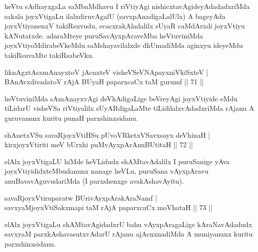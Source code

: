 \begin{artha}
heVtu sAdhayxgaLa saMbaMdhavu I riVtiyAgi nishicxtavAgideyAdadadxriMda sakala joyxVtigaLu ilalxdiruvAgalU (savxpAnxdigaLalUlx) A bageyAda joyxVtiyanenxV takiRsuvudu, ecacxrakAladalilx sUyaR caMdArxdi joyxVtiyu kANutatxde. adaraMteye puruSavAyxpAraveMba heVtuviniMda joyxVtiyoMdirabeVkeMdu saMshayavilalxde dhUmadiMda aginxyu ideyeMdu takiRsuvaMte takiRsabeVku.
\end{artha}


\begin{shl}
liknAgxtAsxmAnayxtoV jAcnxteV visheVSeVNApayxniVkiSxteV | \\
BAnAvxdivadatoV rAjA BUyaH paparxcaCx taM gurumf \hfill||  71 ||  
\end{shl}

\begin{artha}
heVtuviniMda sAmAnayxvAgi deVhAdigaLige beVreyAgi joyxVtiyide eMdu tiLidarU visheVSa riVtiyalilx sUyARdigaLaMte tiLidilalxvAdadxriMda rAjanu A guruvanunx kuritu punaH parxshinxsidanu.
\end{artha}

\begin{shl}
shAnetxVSu savaRjoyxVtiHSu pUvoVRketxVSavxsayx deVhinaH | \\
kirxjoyxVtiriti meV bUrxhi puMvAyxpArAnuBUtitaH \hfill||  72 ||  
\end{shl}

\begin{artha}
elAlx joyxVtigaLU hiMde heVLidudx shAMtavAdalilx I puruSanige yAva joyxVtiyididxteMbudanunx nanage heVLu, puruSana vAyxpAravu anuBavavAguvudariMda (I parxshenxge avakAshavAyitu).
\end{artha}


\begin{shl}
savaRjoyxVtiruparatw BUrivAyxpArakAraNamf | \\
savxyaMjoyxVtiSakxmapi taM rAjA paparxcaCx moVhataH \hfill||  73 ||  
\end{shl}

\begin{artha}
elAlx joyxVtigaLu shAMtavAgidadxrU bahu vAyxpAragaLige kAraNavAdadudx savxyaM parxkAshavasutxvAdarU rAjanu ajAcnxnadiMda A muniyanunx kuritu parxshinxsidanu.
\end{artha}


